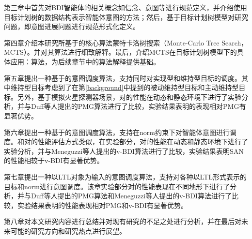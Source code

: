 第三章中首先对BDI智能体的相关概念如信念、意图等进行规范定义，并介绍使用目标计划树的数据结构表示智能体意图的方法；然后，基于目标计划树模型对研究问题，即意图进展问题进行规范形式化定义。

第四章介绍本研究所基于的核心算法蒙特卡洛树搜索（Monte-Carlo Tree Search，MCTS）。并对其算法进行细致解释。最后，介绍MCTS在目标计划树模型下的具体应用：\SA 算法，为后续章节中的算法解释提供基础。

第五章提出一种基于\SA 的意图调度算法\SAM ，\SAM 支持同时对实现型和维持型目标的调度。其中维持型目标考虑到了在第\ref{background}中提到的被动维持型目标和主动维持型目标。另外，基于模拟火星探测器场景，对\SAM 的性能在动态和静态环境下进行了实验分析，并与Duff等人提出的PMG\cite{DBLP:conf/atal/DuffHT06}算法进行了比较，实验结果表明\SAM 的表现相对PMG有显著优势。

第六章提出一种基于\SA 的意图调度算法\SAN ，\SAN 支持在norm约束下对智能体意图进行调度。和对\SAM 的性能评估方式类似，在实验部分，对\SAN 的性能在动态和静态环境下进行了实验分析，并与Meneguzzi等人提出的v-BDI\cite{DBLP:journals/eaai/MeneguzziROVL15}算法进行了比较，实验结果表明SAN的性能相较于v-BDI有显著优势。

第七章提出一种以LTL对象为输入的意图调度算法\SAT，支持对各种以LTL形式表示的目标和norm进行意图调度。该章实验部分对\SAT 的性能表现在不同地形下进行了分析，并与Duff等人提出的PMG\cite{DBLP:conf/atal/DuffHT06}算法和Meneguzzi等人提出的v-BDI算法进行了比较，实验结果表明\SAT 的性能表现相对PMG和v-BDI有显著优势。

第八章对本文研究内容进行总结并对现有研究的不足之处进行分析，并在最后对未来可能的研究方向和研究热点进行展望。
